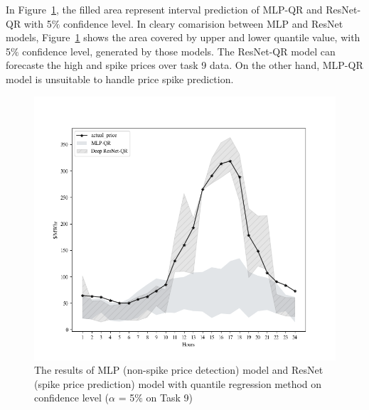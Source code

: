 \documentclass[review]{elsarticle}
\begin{document}
    In Figure~\ref{Fig:compare_spike_and_non_spike_model}, the filled area represent interval prediction of MLP-QR and ResNet-QR with 5$\%$ confidence level.
    In cleary comarision between MLP and ResNet models, Figure~\ref{Fig:compare_spike_and_non_spike_model} shows the area covered by upper and lower quantile value, with 5$\%$ confidence level, generated by those models.
    The ResNet-QR model can forecaste the high and spike prices over task 9 data. On the other hand, MLP-QR model is unsuitable to handle price spike prediction.
    \begin{figure}[H]
      \centering
      \includegraphics[width=12cm]{Task_9-compare_between_non-spike_and_spike}
      \caption{The results of MLP (non-spike price detection) model and ResNet (spike price prediction) model with quantile regression method on confidence level ($\alpha$ = 5$\%$ on Task 9)}
      \label{Fig:compare_spike_and_non_spike_model}
    \end{figure}
\end{document}
